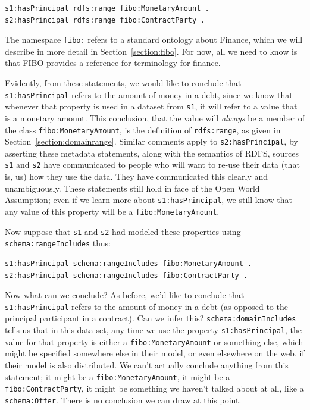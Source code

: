 \begin{lstlisting}
s1:hasPrincipal rdfs:range fibo:MonetaryAmount .
s2:hasPrincipal rdfs:range fibo:ContractParty .
\end{lstlisting}

The namespace \texttt{fibo:} refers to a standard ontology about Finance, which we will describe in more detail
in Section~\ref{section:fibo}. For now, all we need to know is that FIBO provides a reference for terminology
for finance.   

Evidently, from these statements, we would like to conclude that \texttt{s1:hasPrincipal} refers to the amount of money 
in a debt, since we know that whenever that property is used in a dataset from \texttt{s1}, it will refer to a value that 
is a monetary amount.  This conclusion, that the value will \emph{always} be a member of the class \texttt{fibo:MonetaryAmount}, 
is the definition of \texttt{rdfs:range}, as given in Section~\ref{section:domainrange}.  Similar comments apply
to \texttt{s2:hasPrincipal}, by asserting these metadata statements, along with the semantics of RDFS, sources \texttt{s1}
and \texttt{s2} have communicated to people who will want to re-use their data (that is, us) how they use the 
data.  They have communicated this clearly and unambiguously.  These statements still hold in face of the Open World Assumption;
even if we learn more about \texttt{s1:hasPrincipal}, we still know that any value of this property will be a \texttt{fibo:MonetaryAmount}. 

Now suppose that \texttt{s1} and \texttt{s2} had modeled these properties using  \texttt{schema:rangeIncludes} thus:

\begin{lstlisting}
s1:hasPrincipal schema:rangeIncludes fibo:MonetaryAmount .
s2:hasPrincipal schema:rangeIncludes fibo:ContractParty .
\end{lstlisting}

Now what can we conclude?  As before, we'd like to conclude that \texttt{s1:hasPrincipal} refers to the amount of money 
in a debt (as opposed to the principal participant in a contract).  Can we infer this?  \texttt{schema:domainIncludes} tells 
us that in this data set, any time we use the property \texttt{s1:hasPrincipal}, the value for that property is either
a \texttt{fibo:MonetaryAmount} or something else, which might be specified somewhere else in their model, 
or even elsewhere on the web, if their model is also distributed.  We can't actually
conclude anything from this statement; it might be a \texttt{fibo:MonetaryAmount}, it might be a \texttt{fibo:ContractParty}, it 
might be something we haven't talked about at all, like a \texttt{schema:Offer}.  There is no conclusion we can draw at this
point. 

